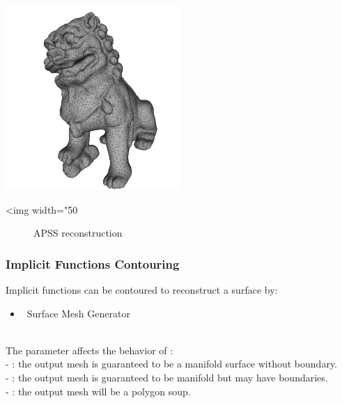  \\
  \\

\begin{center}
    \label{Surface_reconstruction_3-fig-APSS}
    \begin{ccTexOnly}
        \includegraphics[width=0.5\textwidth]{Surface_reconstruction_3/APSS} %
    \end{ccTexOnly}
    \begin{ccHtmlOnly}
        <img width="50%
    \end{ccHtmlOnly}
    \begin{figure}[h]
        \caption{APSS reconstruction}
    \end{figure}
\end{center}


\subsubsection{Implicit Functions Contouring}

Implicit functions can be contoured to reconstruct a surface by:

\begin{itemize}
\item \cgal\ Surface Mesh Generator~\cite{cgal:ry-gsddrm-06,cgal:bo-pgsms-05}
\end{itemize}

  \\

The parameter  affects the behavior of : \\
- : the output mesh is guaranteed to be a manifold
surface without boundary.\\
- : the output mesh is guaranteed to be
manifold but may have boundaries.\\
- : the output mesh will be a polygon soup.

